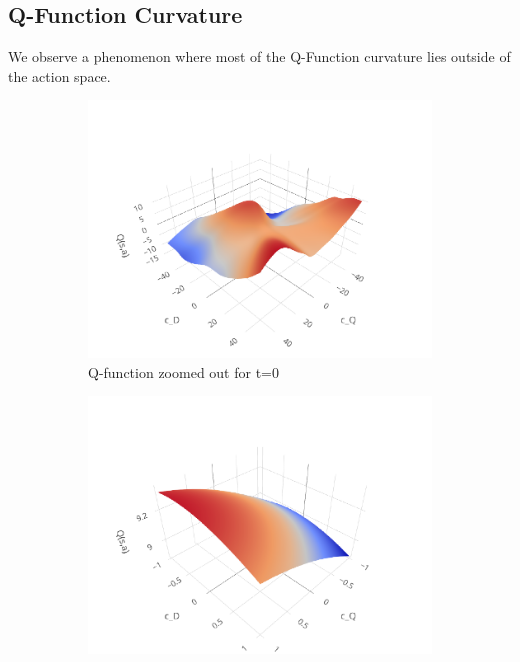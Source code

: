 \subsection{Q-Function Curvature}

We observe a phenomenon where most of the Q-Function curvature lies outside of the action space.

\begin{figure}[hbt]
  \centering
  \begin{subfigure}[b]{0.48\textwidth}
      \centering
      \includegraphics[width=\textwidth]{images/frame_zoomout.pdf}
      \caption{Q-function zoomed out for t=0}
      \label{fig:qf-zoom}
  \end{subfigure}
  \begin{subfigure}[b]{0.48\textwidth}
    \centering
    \includegraphics[width=\textwidth]{images/frame_0.pdf}

\end{subfigure}
\end{figure}

